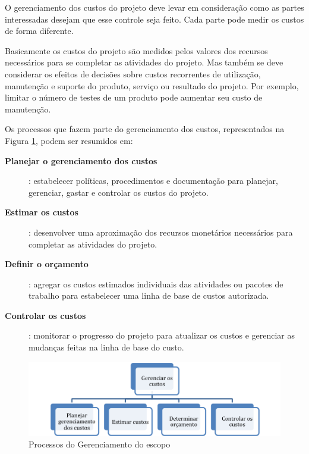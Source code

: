 


O gerenciamento dos custos do projeto deve levar em consideração como as partes interessadas desejam que esse controle seja feito. Cada parte pode medir os custos de forma diferente.

Basicamente os custos do projeto são medidos pelos valores dos recursos necessários para se completar as atividades do projeto. Mas também se deve considerar os efeitos de decisões sobre custos recorrentes de utilização, manutenção e suporte do produto, serviço ou resultado do projeto. Por exemplo, limitar o número de testes de um produto pode aumentar seu custo de manutenção.

Os processos que fazem parte do gerenciamento dos custos, representados na Figura \ref{fig:proc:ger:custos}, podem ser resumidos em:

\begin{description}
	
	\item[\textbf{Planejar o gerenciamento dos custos}]: estabelecer políticas, procedimentos e documentação para planejar, gerenciar, gastar e controlar os custos do projeto.
	
	\item[\textbf{Estimar os custos}]: desenvolver uma aproximação dos recursos monetários necessários para completar as atividades do projeto.

	\item[\textbf{Definir o orçamento}]: agregar os custos estimados individuais das atividades ou pacotes de trabalho para estabelecer uma linha de base de custos autorizada.
	
	\item[\textbf{Controlar os custos}]: monitorar o progresso do projeto para atualizar os custos e gerenciar as mudanças feitas na linha de base do custo.	

\end{description}

\begin{figure}[!h]
	\centering
	\includegraphics[scale=0.75]{Figuras/gerenciamento_custos.png}
	\caption{Processos do Gerenciamento do escopo}
	\label{fig:proc:ger:custos}
\end{figure}

